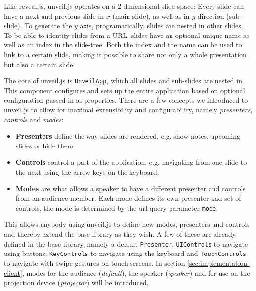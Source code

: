 Like reveal.js, unveil.js operates on a $2$-dimensional slide-space: Every slide can have a next and previous slide in $x$ (main slide), as well as in $y$-direction (sub-slide). To generate the $y$ axis, programatically, slides are nested in other slides.
To be able to identify slides from a URL, slides have an optional unique name as well as an index in the slide-tree. Both the index and the name can be used to link to a certain slide, making it possible to share not only a whole presentation but also a certain slide.

The core of unveil.js is \texttt{UnveilApp}, which all slides and sub-slides are nested in. This component configures and sets up the entire application based on optional configuration passed in as properties. There are a few concepts we introduced to unveil.js to allow for maximal extensibility and configurability, namely \emph{presenters}, \emph{controls} and \emph{modes}:
%
\begin{itemize}
\item \textbf{Presenters} define the way slides are rendered, e.g. show notes, upcoming slides or hide them.
\item \textbf{Controls} control a part of the application, e.g. navigating from one slide to the next using the arrow keys on the keyboard.
\item \textbf{Modes} are what allows a speaker to have a different presenter and controls from an audience member. Each mode defines its own presenter and set of controls, the mode is determined by the url query parameter \texttt{mode}.
\end{itemize}
This allows anybody using unveil.js to define new modes, presenters and controls and thereby extend the base library as they wish. A few of these are already defined in the base library, namely a default \texttt{Presenter}, \texttt{UIControls} to navigate using buttons, \texttt{KeyControls} to navigate using the keyboard and \texttt{TouchControls} to navigate with swipe-gestures on touch screens. In section \ref{sec:implementation-client}, modes for the audience (\emph{default}), the speaker (\emph{speaker}) and for use on the projection device (\emph{projector}) will be introduced.

